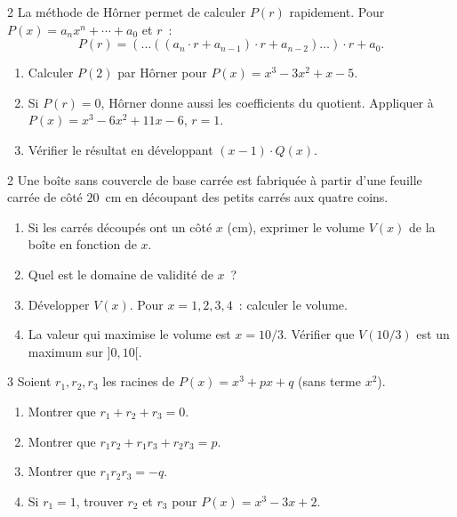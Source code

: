 \begin{probleme}{2}
La m\'ethode de H\^orner permet de calculer $P(r)$ rapidement.
Pour $P(x) = a_n x^n + \cdots + a_0$ et $r$~:
$$P(r) = (\ldots((a_n \cdot r + a_{n-1})\cdot r + a_{n-2})\ldots)\cdot r + a_0.$$
\begin{enumerate}
  \item Calculer $P(2)$ par H\^orner pour $P(x) = x^3 - 3x^2 + x - 5$.
  \item Si $P(r) = 0$, H\^orner donne aussi les coefficients du quotient.
        Appliquer \`a $P(x) = x^3 - 6x^2 + 11x - 6$, $r=1$.
  \item V\'erifier le r\'esultat en d\'eveloppant $(x-1)\cdot Q(x)$.
\end{enumerate}
\end{probleme}

\begin{probleme}{2}
Une bo\^ite sans couvercle de base carr\'ee est fabriqu\'ee \`a partir d'une
feuille carr\'ee de c\^ot\'e $20$~cm en d\'ecoupant des petits carr\'es aux
quatre coins.
\begin{enumerate}
  \item Si les carr\'es d\'ecoup\'es ont un c\^ot\'e $x$ (cm), exprimer le volume
        $V(x)$ de la bo\^ite en fonction de $x$.
  \item Quel est le domaine de validit\'e de $x$~?
  \item D\'evelopper $V(x)$.
        Pour $x = 1, 2, 3, 4$~: calculer le volume.
  \item La valeur qui maximise le volume est $x = 10/3$.
        V\'erifier que $V(10/3)$ est un maximum sur $]0,10[$.
\end{enumerate}
\end{probleme}

\begin{probleme}{3}
Soient $r_1, r_2, r_3$ les racines de $P(x) = x^3 + px + q$ (sans terme $x^2$).
\begin{enumerate}
  \item Montrer que $r_1 + r_2 + r_3 = 0$.
  \item Montrer que $r_1 r_2 + r_1 r_3 + r_2 r_3 = p$.
  \item Montrer que $r_1 r_2 r_3 = -q$.
  \item Si $r_1 = 1$, trouver $r_2$ et $r_3$ pour $P(x) = x^3 - 3x + 2$.
\end{enumerate}
\end{probleme}

